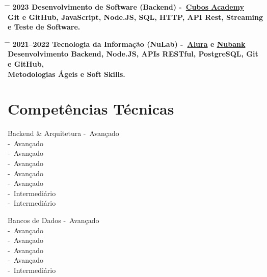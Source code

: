 \documentclass{article}
\begin{document}
\begin{tabbing}
	\hspace{2cm} \= \hspace{4cm} \= \kill
	\bf{2023} \> \textbf{Desenvolvimento de Software (Backend)} -~\href{https://cubos.academy/}{Cubos Academy} \\
	\> Git e GitHub, JavaScript, Node.JS, SQL, HTTP, API Rest, Streaming e Teste de Software. \\
\end{tabbing}

\begin{tabbing}
	\hspace{2cm} \= \hspace{4cm} \= \kill
	\bf{2021--2022} \> \textbf{Tecnologia da Informação (NuLab)} -~\href{https://www.alura.com.br/}{Alura} e \href{https://nubank.com.br/}{Nubank} \\
	\> Desenvolvimento Backend, Node.JS, APIs RESTful, PostgreSQL, Git e GitHub, \\
	\> Metodologias Ágeis e Soft Skills. \\
\end{tabbing}

\section*{Competências Técnicas}

\begin{skillgroup}{Backend \& Arquitetura}%
	 -\ Avançado \\
	 -\ Avançado \\
	 -\ Avançado \\
	 -\ Avançado \\
	 -\ Avançado \\
	 -\ Avançado \\
	 -\ Intermediário \\
	 -\ Intermediário \\
\end{skillgroup}

\begin{skillgroup}{Bancos de Dados}%
	 -\ Avançado \\
	 -\ Avançado \\
	 -\ Avançado \\
	 -\ Avançado \\
	 -\ Avançado \\
	 -\ Intermediário
\end{skillgroup}
\end{document}

